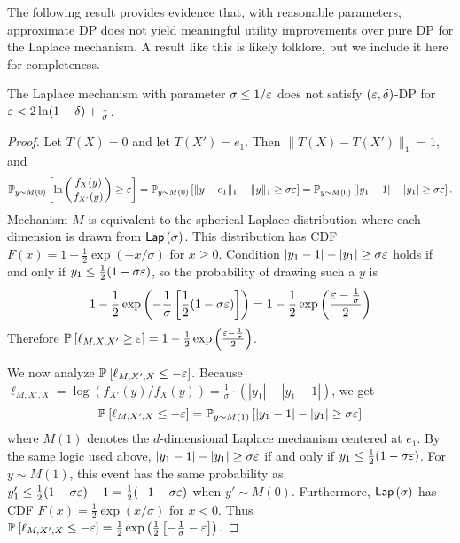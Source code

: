 The following result provides evidence that, with reasonable parameters, approximate DP does not yield meaningful utility improvements over pure DP for the Laplace mechanism. A result like this is likely folklore, but we include it here for completeness.
\begin{lemma}
\label{lem:laplace_approx}
    The Laplace mechanism with parameter $\sigma \leq 1/\varepsilon$ does not satisfy $(\varepsilon, \delta)$-DP for $\varepsilon < 2\ln(1-\delta) + \frac{1}{\sigma}$.
\end{lemma}
\begin{proof}
    Let $T(X) = 0$ and let $T(X') = e_1$. Then $\|T(X) - T(X')\|_1 = 1$, and
    \begin{equation*}
        \mathbb{P}_{y \sim M(0)}\left[\ln\left(\frac{f_X(y)}{f_{X'}(y)}\right) \geq \varepsilon\right] = \mathbb{P}_{y \sim M(0)}\left[ \|y-e_1\|_1 - \|y\|_1 \geq \sigma \varepsilon\right] = \mathbb{P}_{y \sim M(0)}\left[|y_1-1| - |y_1| \geq \sigma \varepsilon\right].
    \end{equation*}
    Mechanism $M$ is equivalent to the spherical Laplace distribution where each dimension is drawn from $\mathsf{Lap}\left(\sigma\right)$. This distribution has CDF $F(x) = 1 - \frac{1}{2}\exp(-x/\sigma)$ for $x \geq 0$. Condition $|y_1 - 1| -|y_1| \geq \sigma \varepsilon$ holds if and only if $y_1 \leq \frac{1}{2}(1 - \sigma \varepsilon)$, so the probability of drawing such a $y$ is
    \begin{equation*}
        1 - \frac{1}{2}\exp\left(-\frac{1}{\sigma}\left[\frac{1}{2}(1-\sigma \varepsilon)\right]\right) = 1 - \frac{1}{2}\exp\left(\frac{\varepsilon - \frac{1}{\sigma}}{2}\right)
    \end{equation*}
    Therefore $\mathbb{P}_{}\left[\ell_{M,X,X'} \geq \varepsilon\right] = 1 - \frac{1}{2}\exp\left(\frac{\varepsilon - \frac{1}{\sigma}}{2}\right)$.
    
    We now analyze $\mathbb{P}_{}\left[\ell_{M,X',X} \leq -\varepsilon\right]$. Because $\ell_{M,X',X} = \log(f_{X'}(y)/f_X(y)) = \frac{1}{\sigma} \cdot (|y_1| - |y_1-1|)$, we get \begin{equation*}
        \mathbb{P}_{}\left[\ell_{M,X',X} \leq -\varepsilon\right] = \mathbb{P}_{y \sim M(1)}\left[|y_1-1| - |y_1| \geq \sigma \varepsilon\right]
    \end{equation*}
    where $M(1)$ denotes the $d$-dimensional Laplace mechanism centered at $e_1$. By the same logic used above, $|y_1-1| - |y_1| \geq \sigma \varepsilon$ if and only if $y_1 \leq \frac{1}{2}(1-\sigma \varepsilon)$. For $y \sim M(1)$, this event has the same probability as $y_1' \leq \frac{1}{2}(1 - \sigma \varepsilon) - 1 = \frac{1}{2}(-1 - \sigma \varepsilon)$ when $y' \sim M(0)$. Furthermore, $\mathsf{Lap}\left(\sigma\right)$ has CDF $F(x) = \frac{1}{2}\exp(x/\sigma)$ for $x < 0$. Thus $\mathbb{P}_{}\left[\ell_{M,X',X} \leq -\varepsilon\right] = \frac{1}{2}\exp\left(\frac{1}{2}\left[-\frac{1}{\sigma} - \varepsilon\right]\right)$.
    

\end{proof}
